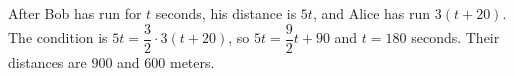 After Bob has run for $t$ seconds, his distance is $5t$, and Alice has run $3(t+20)$. The condition is $5t=\dfrac{3}{2}\cdot3(t+20)$, so $5t=\dfrac{9}{2}t+90$ and $\boxed{t=180}$ seconds. Their distances are $900$ and $600$ meters.
